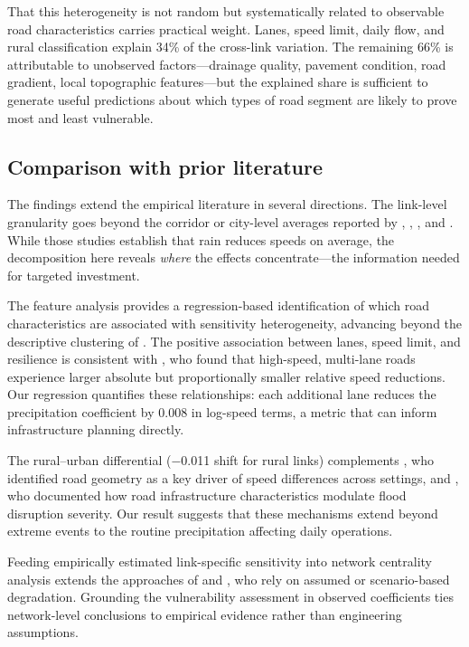 \documentclass[review]{elsarticle}
\begin{document}
That this heterogeneity is not random but systematically related to observable road characteristics carries practical weight. Lanes, speed limit, daily flow, and rural classification explain 34\% of the cross-link variation. The remaining 66\% is attributable to unobserved factors---drainage quality, pavement condition, road gradient, local topographic features---but the explained share is sufficient to generate useful predictions about which types of road segment are likely to prove most and least vulnerable.

\subsection{Comparison with prior literature}
\label{sec:disc:lit}

The findings extend the empirical literature in several directions. The link-level granularity goes beyond the corridor or city-level averages reported by \citet{hranac2006empirical}, \citet{becker2026rainfall}, \citet{koetse2009impact}, and \citet{bi2022weather}. While those studies establish that rain reduces speeds on average, the decomposition here reveals \textit{where} the effects concentrate---the information needed for targeted investment.

The feature analysis provides a regression-based identification of which road characteristics are associated with sensitivity heterogeneity, advancing beyond the descriptive clustering of \citet{gao2024resilience}. The positive association between lanes, speed limit, and resilience is consistent with \citet{becker2026rainfall}, who found that high-speed, multi-lane roads experience larger absolute but proportionally smaller relative speed reductions. Our regression quantifies these relationships: each additional lane reduces the precipitation coefficient by 0.008 in log-speed terms, a metric that can inform infrastructure planning directly.

The rural--urban differential ($-$0.011 shift for rural links) complements \citet{raccagni2024urban}, who identified road geometry as a key driver of speed differences across settings, and \citet{pregnolato2017depth}, who documented how road infrastructure characteristics modulate flood disruption severity. Our result suggests that these mechanisms extend beyond extreme events to the routine precipitation affecting daily operations.

Feeding empirically estimated link-specific sensitivity into network centrality analysis extends the approaches of \citet{wassmer2024resilience} and \citet{stamos2023centrality}, who rely on assumed or scenario-based degradation. Grounding the vulnerability assessment in observed coefficients ties network-level conclusions to empirical evidence rather than engineering assumptions.
\end{document}
